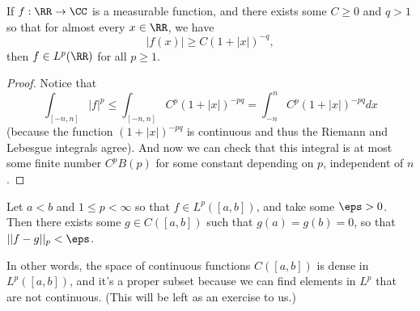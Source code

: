 \begin{corollary}
If $f: \RR \to \CC$ is a measurable function, and there exists some $C \ge 0$ and $q > 1$ so that for almost every $x \in \RR$, we have
\[
    |f(x)| \ge C(1 + |x|)^{-q},
\]
then $f \in L^p(\RR)$ for all $p \ge 1$.
\end{corollary}
\begin{proof}
Notice that 
\[
    \int_{[-n, n]} |f|^p \le \int_{[-n, n]} C^p(1 + |x|)^{-pq} = \int_{-n}^n C^p(1 + |x|)^{-pq} dx 
\]
(because the function $(1+|x|)^{-pq}$ is continuous and thus the Riemann and Lebesgue integrals agree). And now we can check that this integral is at most some finite number $C^pB(p)$ for some constant depending on $p$, independent of $n$.
\end{proof}

\begin{proposition}
Let $a < b$ and $1 \le p < \infty$ so that $f \in L^p([a, b])$, and take some $\eps > 0$. Then there exists some $g \in C([a, b])$ such that $g(a) = g(b) = 0$, so that $||f-g||_p < \eps$.
\end{proposition}

In other words, the space of continuous functions $C([a, b])$ is dense in $L^p([a, b])$, and it's a proper subset because we can find elements in $L^p$ that are not continuous. (This will be left as an exercise to us.)

